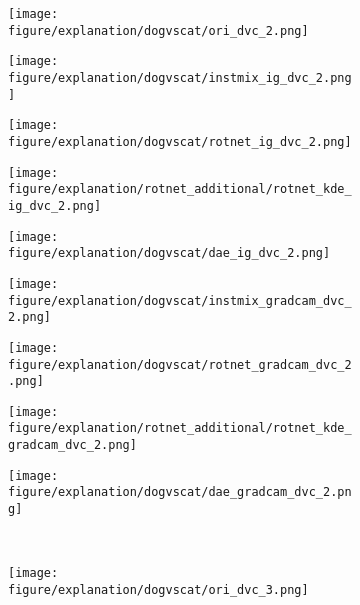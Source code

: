 \documentclass{article} \usepackage{iclr2021_conference,times}
\begin{document}
\begin{figure}[h!]
\begin{subfigure}{.11\textwidth}
  \centering
  \texttt{[image: figure/explanation/dogvscat/ori\_dvc\_2.png]}
\end{subfigure}
\hspace{-2mm}
\begin{subfigure}{.11\textwidth}
  \centering
  \texttt{[image: figure/explanation/dogvscat/instmix\_ig\_dvc\_2.png]}
\end{subfigure}
\hspace{-2mm}
\begin{subfigure}{.11\textwidth}
  \centering
  \texttt{[image: figure/explanation/dogvscat/rotnet\_ig\_dvc\_2.png]}
\end{subfigure}
\hspace{-2mm}
\begin{subfigure}{.11\textwidth}
  \centering
  \texttt{[image: figure/explanation/rotnet\_additional/rotnet\_kde\_ig\_dvc\_2.png]}
\end{subfigure}
\hspace{-2mm}
\begin{subfigure}{.11\textwidth}
  \centering
  \texttt{[image: figure/explanation/dogvscat/dae\_ig\_dvc\_2.png]}
\end{subfigure}
\hspace{-2mm}
\begin{subfigure}{.11\textwidth}
  \centering
  \texttt{[image: figure/explanation/dogvscat/instmix\_gradcam\_dvc\_2.png]}
\end{subfigure}
\hspace{-2mm}
\begin{subfigure}{.11\textwidth}
  \centering
  \texttt{[image: figure/explanation/dogvscat/rotnet\_gradcam\_dvc\_2.png]}
\end{subfigure}
\hspace{-2mm}
\begin{subfigure}{.11\textwidth}
  \centering
  \texttt{[image: figure/explanation/rotnet\_additional/rotnet\_kde\_gradcam\_dvc\_2.png]}
\end{subfigure}
\hspace{-2mm}
\begin{subfigure}{.11\textwidth}
  \centering
  \texttt{[image: figure/explanation/dogvscat/dae\_gradcam\_dvc\_2.png]}
\end{subfigure}\\
\begin{subfigure}{.11\textwidth}
  \centering
  \texttt{[image: figure/explanation/dogvscat/ori\_dvc\_3.png]}

\end{subfigure}
\end{figure}
\end{document}
